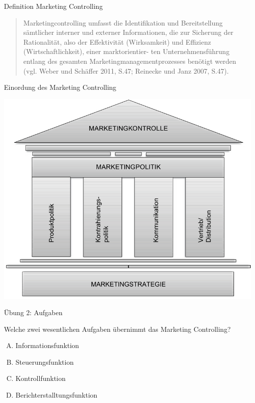 \documentclass[12pt,ngerman,a4paper,ignorenonframetext,]{beamer}
\providecommand{\tightlist}{%
  \setlength{\itemsep}{0pt}\setlength{\parskip}{0pt}}
\begin{document}
\begin{frame}{Definition Marketing Controlling}
\protect\hypertarget{definition-marketing-controlling}{}

\begin{quote}
Marketingcontrolling umfasst die Identifikation und Bereitstellung
sämtlicher interner und externer Informationen, die zur Sicherung der
Rationalität, also der Effektivität (Wirksamkeit) und Effizienz
(Wirtschaftlichkeit), einer marktorientier- ten Unternehmensführung
entlang des gesamten Marketingmanagementprozesses benötigt werden (vgl.
Weber und Schäffer 2011, S.47; Reinecke und Janz 2007, S.47).
\end{quote}

\end{frame}

\begin{frame}{Einordung des Marketing Controlling}
\protect\hypertarget{einordung-des-marketing-controlling}{}

\begin{center}\includegraphics[width=0.7\linewidth]{./images/Marketingcontrolling/Marketingcontrolling} \end{center}

\end{frame}

\begin{frame}{Übung 2: Aufgaben}
\protect\hypertarget{ubung-2-aufgaben}{}

Welche zwei wesentlichen Aufgaben übernimmt das Marketing Controlling?

\begin{enumerate}
[A.]
\tightlist
\item
  Informationsfunktion
\item
  Steuerungsfunktion
\item
  Kontrollfunktion
\item
  Berichterstalltungsfunktion
\end{enumerate}


\end{frame}
\end{document}
